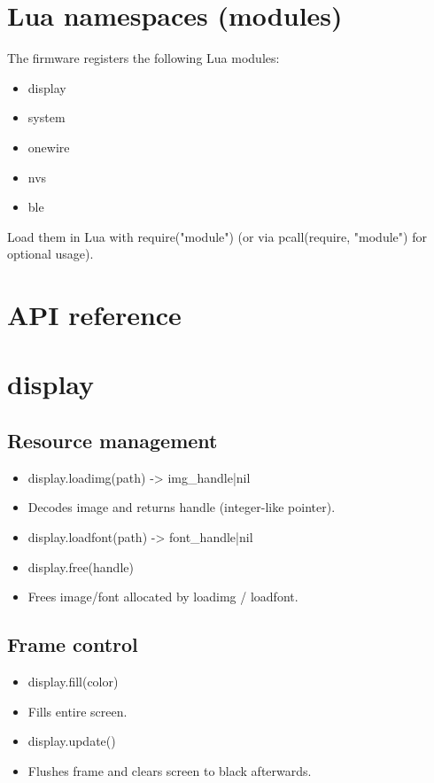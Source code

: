 \section{Lua namespaces (modules)}
The firmware registers the following Lua modules:

\begin{itemize}
\item display
\item system
\item onewire
\item nvs
\item ble
\end{itemize}
Load them in Lua with require("module") (or via pcall(require, "module") for optional usage).

\section{API reference}
\section{display}
\subsection{Resource management}
\begin{itemize}
\item display.loadimg(path) -> img\_handle|nil
\end{itemize}
\begin{itemize}
\item Decodes image and returns handle (integer-like pointer).
\end{itemize}
\begin{itemize}
\item display.loadfont(path) -> font\_handle|nil
\item display.free(handle)
\end{itemize}
\begin{itemize}
\item Frees image/font allocated by loadimg / loadfont.
\end{itemize}
\subsection{Frame control}
\begin{itemize}
\item display.fill(color)
\end{itemize}
\begin{itemize}
\item Fills entire screen.
\end{itemize}
\begin{itemize}
\item display.update()
\end{itemize}
\begin{itemize}
\item Flushes frame and clears screen to black afterwards.
\end{itemize}
